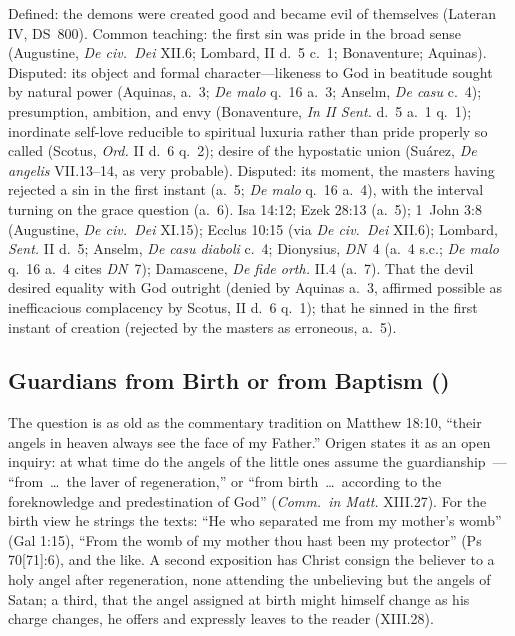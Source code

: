  {Defined: the demons were created good and became evil of themselves
  (Lateran IV, DS~800). Common teaching: the first sin was pride in the
  broad sense (Augustine, \emph{De civ.\ Dei} XII.6; Lombard, II d.~5
  c.~1; Bonaventure; Aquinas). Disputed: its object and formal
  character---likeness to God in beatitude sought by natural power
  (Aquinas, a.~3; \emph{De malo} q.~16 a.~3; Anselm, \emph{De casu}
  c.~4); presumption, ambition, and envy (Bonaventure, \emph{In II Sent.}
  d.~5 a.~1 q.~1); inordinate self-love reducible to spiritual luxuria
  rather than pride properly so called (Scotus, \emph{Ord.} II d.~6
  q.~2); desire of the hypostatic union (Suárez, \emph{De angelis}
  VII.13--14, as very probable). Disputed: its moment, the masters having
  rejected a sin in the first instant (a.~5; \emph{De malo} q.~16 a.~4),
  with the interval turning on the grace question (a.~6).}
 {Isa 14:12; Ezek 28:13 (a.~5); 1~John 3:8 (Augustine, \emph{De civ.\
  Dei} XI.15); Ecclus 10:15 (via \emph{De civ.\ Dei} XII.6); Lombard,
  \emph{Sent.} II d.~5; Anselm, \emph{De casu diaboli} c.~4; Dionysius,
  \emph{DN}~4 (a.~4 s.c.; \emph{De malo} q.~16 a.~4 cites \emph{DN}~7);
  Damascene, \emph{De fide orth.} II.4 (a.~7).}
 {That the devil desired equality with God outright (denied by Aquinas
  a.~3, affirmed possible as inefficacious complacency by Scotus, II d.~6
  q.~1); that he sinned in the first instant of creation (rejected by the
  masters as erroneous, a.~5).}

\subsection{Guardians from Birth or from Baptism ()}\label{sec:dq-guardians}

The question is as old as the commentary tradition on Matthew 18:10,
``their angels in heaven always see the face of my Father.'' Origen
states it as an open inquiry: at what time do the angels of the little
ones assume the guardianship~--- ``from~\dots\ the laver of
regeneration,'' or ``from birth~\dots\ according to the foreknowledge and
predestination of God'' (\emph{Comm.\ in Matt.} XIII.27). For the birth
view he strings the texts: ``He who separated me from my mother's womb''
(Gal 1:15), ``From the womb of my mother thou hast been my protector''
(Ps 70[71]:6), and the like. A second exposition has Christ consign the
believer to a holy angel after regeneration, none attending the
unbelieving but the angels of Satan; a third, that the angel assigned at
birth might himself change as his charge changes, he offers and expressly
leaves to the reader (XIII.28).

